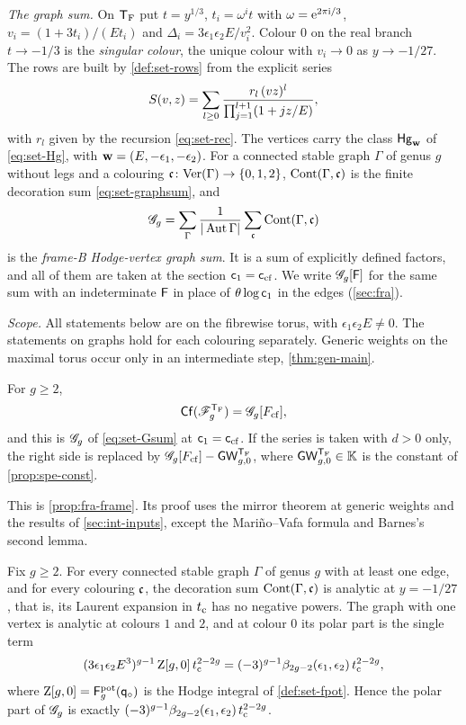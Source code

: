 \emph{The graph sum.} On $\mathsf{T}_{\mathrm{F}}$ put $t=y^{1/3}$, $t_i=\omega^it$ with $\omega=\mathrm{e}^{2\pi\mathrm{i}/3}$, $v_i=(1+3t_i)/(Et_i)$ and $\Delta_i=3\epsilon_1\epsilon_2E/v_i^2$. Colour $0$ on the real branch $t\to-1/3$ is the \emph{singular colour}, the unique colour with $v_i\to 0$ as $y\to-1/27$. The rows are built by \cref{def:set-rows} from the explicit series
\[
S(v,z)=\sum_{l\geq0}\frac{r_l\,(vz)^l}{\prod_{j=1}^{l+1}(1+jz/E)},
\]
with $r_l$ given by the recursion \eqref{eq:set-rec}. The vertices carry the class $\mathsf{Hg}_{\mathbf{w}}$ of \eqref{eq:set-Hg}, with $\mathbf{w}=(E,-\epsilon_1,-\epsilon_2)$. For a connected stable graph $\Gamma$ of genus $g$ without legs and a colouring $\mathfrak{c}\colon\mathrm{Ver}(\Gamma)\to\{0,1,2\}$, $\mathrm{Cont}(\Gamma,\mathfrak{c})$ is the finite decoration sum \eqref{eq:set-graphsum}, and
\[
\mathscr{G}_g=\sum_{\Gamma}\frac{1}{|\operatorname{Aut}\Gamma|}\sum_{\mathfrak{c}}\mathrm{Cont}(\Gamma,\mathfrak{c})
\]
is the \emph{frame-B Hodge-vertex graph sum}. It is a sum of explicitly defined factors, and all of them are taken at the section $\mathsf{c}_{1}=\mathsf{c}_{\mathrm{cf}}$. We write $\mathscr{G}_g[\mathsf{F}]$ for the same sum with an indeterminate $\mathsf{F}$ in place of $\theta\log\mathsf{c}_{1}$ in the edges (\cref{sec:fra}).

\emph{Scope.} All statements below are on the fibrewise torus, with $\epsilon_1\epsilon_2E\neq 0$. The statements on graphs hold for each colouring separately. Generic weights on the maximal torus occur only in an intermediate step, \cref{thm:gen-main}.

\begin{thm}
\label{thm:int-frame}
For $g\geq 2$,
\[
\mathsf{Cf}(\mathscr{F}_g^{\mathsf{T}_{\mathrm{F}}})=\mathscr{G}_g[F_{\mathrm{cf}}],
\]
and this is $\mathscr{G}_g$ of \eqref{eq:set-Gsum} at $\mathsf{c}_{1}=\mathsf{c}_{\mathrm{cf}}$. If the series is taken with $d>0$ only, the right side is replaced by $\mathscr{G}_g[F_{\mathrm{cf}}]-\mathsf{GW}_{g,0}^{\mathsf{T}_{\mathrm{F}}}$, where $\mathsf{GW}_{g,0}^{\mathsf{T}_{\mathrm{F}}}\in\mathbb{K}$ is the constant of \cref{prop:spe-const}.
\end{thm}

This is \cref{prop:fra-frame}. Its proof uses the mirror theorem \cite[Theorem~31]{CCIT15} at generic weights and the results of \cref{sec:int-inputs}, except the Mari\~no--Vafa formula and Barnes's second lemma.

\begin{thm}
\label{thm:int-regularity}
Fix $g\geq 2$. For every connected stable graph $\Gamma$ of genus $g$ with at least one edge, and for every colouring $\mathfrak{c}$, the decoration sum $\mathrm{Cont}(\Gamma,\mathfrak{c})$ is analytic at $y=-1/27$, that is, its Laurent expansion in $t_{\mathrm{c}}$ has no negative powers. The graph with one vertex is analytic at colours $1$ and $2$, and at colour $0$ its polar part is the single term
\[
(3\epsilon_1\epsilon_2E^3)^{g-1}\,\mathrm{Z}[g,0]\,t_{\mathrm{c}}^{2-2g}=(-3)^{g-1}\beta_{2g-2}(\epsilon_1,\epsilon_2)\,t_{\mathrm{c}}^{2-2g},
\]
where $\mathrm{Z}[g,0]=\mathsf{F}^{\mathrm{pot}}_g(\mathsf{q}_{\circ})$ is the Hodge integral of \cref{def:set-fpot}. Hence the polar part of $\mathscr{G}_g$ is exactly $(-3)^{g-1}\beta_{2g-2}(\epsilon_1,\epsilon_2)\,t_{\mathrm{c}}^{2-2g}$.
\end{thm}

